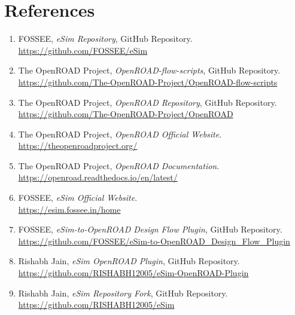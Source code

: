 \chapter*{References}

\begin{enumerate}

\item FOSSEE, \textit{eSim Repository}, GitHub Repository.\\
\url{https://github.com/FOSSEE/eSim}

\item The OpenROAD Project, \textit{OpenROAD-flow-scripts}, GitHub Repository.\\
\url{https://github.com/The-OpenROAD-Project/OpenROAD-flow-scripts}

\item The OpenROAD Project, \textit{OpenROAD Repository}, GitHub Repository.\\
\url{https://github.com/The-OpenROAD-Project/OpenROAD}

\item The OpenROAD Project, \textit{OpenROAD Official Website}.\\
\url{https://theopenroadproject.org/}

\item The OpenROAD Project, \textit{OpenROAD Documentation}.\\
\url{https://openroad.readthedocs.io/en/latest/}

\item FOSSEE, \textit{eSim Official Website}.\\
\url{https://esim.fossee.in/home}

\item FOSSEE, \textit{eSim-to-OpenROAD Design Flow Plugin}, GitHub Repository.\\
\url{https://github.com/FOSSEE/eSim-to-OpenROAD_Design_Flow_Plugin}

\item Rishabh Jain, \textit{eSim OpenROAD Plugin}, GitHub Repository.\\
\url{https://github.com/RISHABH12005/eSim-OpenROAD-Plugin}

\item Rishabh Jain, \textit{eSim Repository Fork}, GitHub Repository.\\
\url{https://github.com/RISHABH12005/eSim}

\end{enumerate}